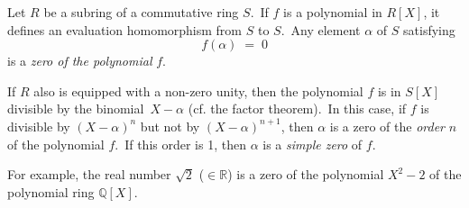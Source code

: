 \documentclass[12pt]{article}
\theoremstyle{definition}
\begin{document}
Let $R$ be a subring of a commutative ring $S$.\, If $f$ is a polynomial in $R[X]$, it defines an evaluation homomorphism from $S$ to $S$.\, Any element $\alpha$ of $S$ satisfying
$$f(\alpha) \;=\; 0$$
is a {\em zero of the polynomial} $f$.

If $R$ also is equipped with a non-zero unity, then the polynomial $f$ is in $S[X]$ divisible by the binomial 
\,$X\!-\!\alpha$ (cf. the factor theorem).\, In this case, if $f$ is divisible by $(X\!-\!\alpha)^n$ but not by 
$(X\!-\!\alpha)^{n+1}$, then $\alpha$ is a zero of the \emph{order} $n$ of the polynomial $f$.\, If this order is 1, then $\alpha$ is a \emph{simple zero} of $f$.

For example, the real number $\sqrt{2}$ ($\in \mathbb{R}$) is a zero of the polynomial $X^2\!-\!2$ of the polynomial ring $\mathbb{Q}[X]$.
\end{document}
